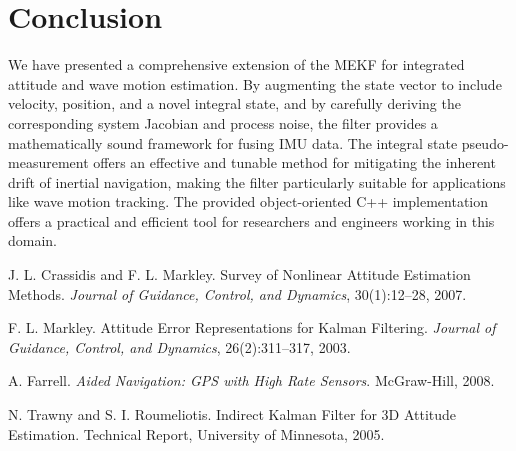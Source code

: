 \documentclass[11pt]{article}
\begin{document}
\section{Conclusion}
\label{sec:conclusion}
We have presented a comprehensive extension of the MEKF for integrated attitude and wave motion estimation. By augmenting the state vector to include velocity, position, and a novel integral state, and by carefully deriving the corresponding system Jacobian and process noise, the filter provides a mathematically sound framework for fusing IMU data. The integral state pseudo-measurement offers an effective and tunable method for mitigating the inherent drift of inertial navigation, making the filter particularly suitable for applications like wave motion tracking. The provided object-oriented C++ implementation offers a practical and efficient tool for researchers and engineers working in this domain.


\begin{thebibliography}{9}
J. L. Crassidis and F. L. Markley.
\newblock Survey of Nonlinear Attitude Estimation Methods.
\newblock \emph{Journal of Guidance, Control, and Dynamics}, 30(1):12--28, 2007.

F. L. Markley.
\newblock Attitude Error Representations for Kalman Filtering.
\newblock \emph{Journal of Guidance, Control, and Dynamics}, 26(2):311–317, 2003.

A. Farrell.
\newblock \emph{Aided Navigation: GPS with High Rate Sensors}.
\newblock McGraw-Hill, 2008.

N. Trawny and S. I. Roumeliotis.
\newblock Indirect Kalman Filter for 3D Attitude Estimation.
\newblock Technical Report, University of Minnesota, 2005.
\end{thebibliography}
\end{document}

